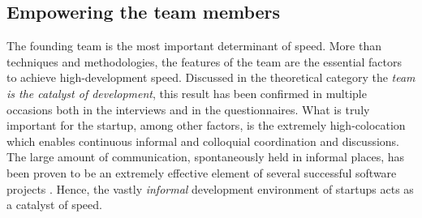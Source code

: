 \documentclass[10pt,journal,letterpaper,compsoc]{IEEEtran}
\begin{document}
\subsection{Empowering the team members} 
The founding team is the most important determinant of speed. More than  
techniques and methodologies, the features of the team are the essential factors 
to achieve high-development speed. Discussed in the theoretical category the  
\textit{team is the catalyst of development}, this result has been confirmed in 
multiple occasions both in the interviews and in the questionnaires. What is  
truly important for the startup, among other factors, is the extremely  
high-colocation which enables continuous informal and colloquial coordination  
and discussions.  
The large amount of communication, spontaneously held in informal places, has  
been proven to be an extremely effective element of several successful software 
projects \cite{Highsmith2000}. Hence, the vastly \textit{informal} development 
environment of startups acts as a catalyst of speed. 

\end{document}
